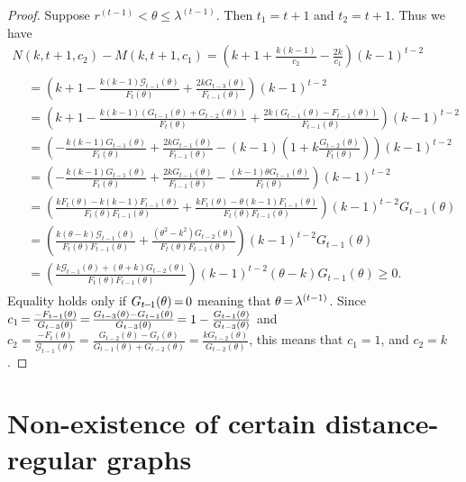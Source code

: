 \documentclass[ALCO,ThmDefs,Unicode,epreuves]{cedram}
\newcommand*{\Mk}{\mkern -2mu}
\begin{document}
\begin{proof}
Suppose $r^{(t-1)} <\theta \leq \lambda^{(t-1)}$. Then $t_1=t+1$ and $t_2=t+1$. Thus we have
\begin{multline*}
N(k,t+1,c_2)-M(k,t+1,c_1)=\left(k+1+\frac{k(k-1)}{c_2}-\frac{2k}{c_1}\right) (k-1)^{t-2}\\
\begin{aligned}
&=\left(k+1-\frac{k(k-1)\mathcal{G}_{t-1}(\theta)}{F_t(\theta)}+\frac{2kG_{t-3}(\theta)}{F_{t-1}(\theta)}\right) (k-1)^{t-2}\\
&=\left(k+1-\frac{k(k-1)(G_{t-1}(\theta)+G_{t-2}(\theta))}{F_t(\theta)}+\frac{2k(G_{t-1}(\theta)-F_{t-1}(\theta))}{F_{t-1}(\theta)}\right) (k-1)^{t-2}\\
&=\left(-\frac{k(k-1)G_{t-1}(\theta)}{F_t(\theta)}+\frac{2kG_{t-1}(\theta)}{F_{t-1}(\theta)}-(k-1)\left(1+k \frac{G_{t-2}(\theta)}{F_t(\theta)}\right) \right) (k-1)^{t-2}\\
&=\left(-\frac{k(k-1)G_{t-1}(\theta)}{F_t(\theta)}+\frac{2kG_{t-1}(\theta)}{F_{t-1}(\theta)}-\frac{(k-1)\theta G_{t-1}(\theta)}{F_t(\theta)} \right) (k-1)^{t-2}\\
&=\left( \frac{kF_t(\theta)-k(k-1)F_{t-1} (\theta)}{F_t(\theta) F_{t-1}(\theta)}+\frac{kF_t(\theta)-\theta(k-1)F_{t-1} (\theta)}{F_t(\theta) F_{t-1}(\theta)}\right) (k-1)^{t-2}G_{t-1}(\theta)\\
&=\left(\frac{k(\theta-k)\mathcal{G}_{t-1}(\theta)}{F_t(\theta) F_{t-1}(\theta)}+\frac{(\theta^2-k^2) G_{t-2}(\theta)}{F_t(\theta) F_{t-1}(\theta)} \right) (k-1)^{t-2}G_{t-1}(\theta)\\
&=\left(\frac{k\mathcal{G}_{t-1}(\theta)+(\theta +k) G_{t-2}(\theta)}{F_t(\theta) F_{t-1}(\theta)} \right) (k-1)^{t-2} (\theta-k) G_{t-1}(\theta)\geq 0. 
\end{aligned}
\end{multline*}
Equality holds only if $G_{t\Mk -\Mk 1}(\theta)\Mk = \Mk 0$ meaning that 
$\theta\Mk =\Mk \lambda^{(t-1)}$. Since $c_1\Mk =\Mk \frac{-F_{t-1}(\theta)}{G_{t-3}(\theta)}
\Mk =\Mk \frac{G_{t-3}(\theta)-G_{t-1}(\theta)}{G_{t-3}(\theta)}\Mk =1-\frac{G_{t-1}(\theta)}{G_{t-3}(\theta)}$ and $c_2=\frac{-F_{t}(\theta)}{\mathcal{G}_{t-1}(\theta)}=\frac{G_{t-2}(\theta)-G_{t}(\theta)}{G_{t-1}(\theta)+G_{t-2}(\theta)}=\frac{kG_{t-2}(\theta)}{G_{t-2}(\theta)}$, this means that
$c_1=1$, and $c_2=k$. 
\end{proof}

\section{Non-existence of certain distance-regular graphs}
\label{sec:bound_d}
\end{document}
